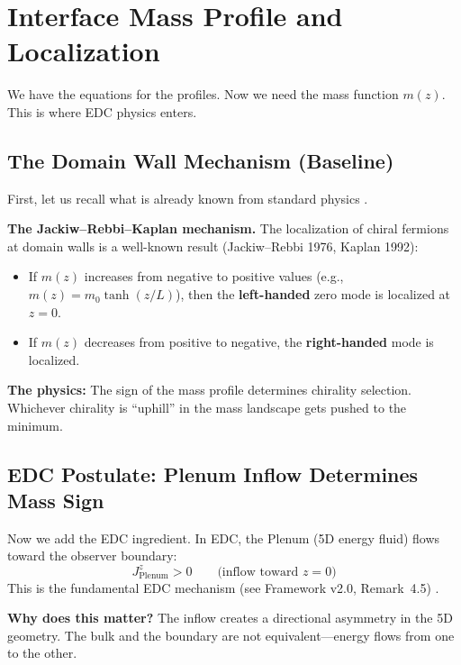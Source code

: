 \section{Interface Mass Profile and Localization}
\label{sec:ch9_localization}

We have the equations for the profiles. Now we need the mass function $m(z)$.
This is where EDC physics enters.

\subsection{The Domain Wall Mechanism (Baseline)}

First, let us recall what is already known from standard physics \tagBL{}.

\textbf{The Jackiw--Rebbi--Kaplan mechanism.} The localization of chiral fermions
at domain walls is a well-known result (Jackiw--Rebbi 1976, Kaplan 1992):
\begin{itemize}[nosep]
    \item If $m(z)$ increases from negative to positive values (e.g., $m(z) = m_0 \tanh(z/L)$),
          then the \textbf{left-handed} zero mode is localized at $z=0$.
    \item If $m(z)$ decreases from positive to negative, the \textbf{right-handed}
          mode is localized.
\end{itemize}

\textbf{The physics:} The sign of the mass profile determines chirality selection.
Whichever chirality is ``uphill'' in the mass landscape gets pushed to the minimum.

\subsection{EDC Postulate: Plenum Inflow Determines Mass Sign}

Now we add the EDC ingredient. In EDC, the Plenum (5D energy fluid) flows toward
the observer boundary:
\begin{equation}
    J^z_{\text{Plenum}} > 0 \qquad \text{(inflow toward $z=0$)}
    \label{eq:ch9_inflow}
\end{equation}
This is the fundamental EDC mechanism (see Framework v2.0, Remark~4.5) \tagP{}.

\textbf{Why does this matter?} The inflow creates a directional asymmetry in
the 5D geometry. The bulk and the boundary are not equivalent---energy flows
from one to the other.

